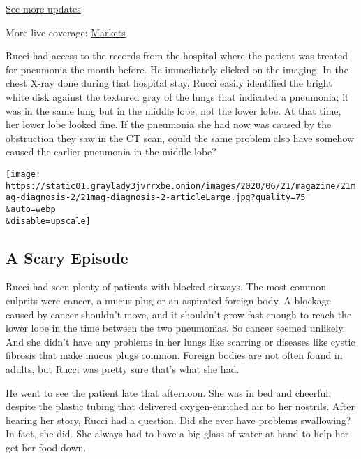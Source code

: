 \href{https://www.nytimes3xbfgragh.onion/2020/09/08/world/covid-19-coronavirus.html?action=click\&pgtype=Article\&state=default\&region=MAIN_CONTENT_1\&context=storylines_live_updates}{See
more updates}

More live coverage:
\href{https://www.nytimes3xbfgragh.onion/live/2020/09/08/business/stock-market-today-coronavirus?action=click\&pgtype=Article\&state=default\&region=MAIN_CONTENT_1\&context=storylines_live_updates}{Markets}

Rucci had access to the records from the hospital where the patient was
treated for pneumonia the month before. He immediately clicked on the
imaging. In the chest X-ray done during that hospital stay, Rucci easily
identified the bright white disk against the textured gray of the lungs
that indicated a pneumonia; it was in the same lung but in the middle
lobe, not the lower lobe. At that time, her lower lobe looked fine. If
the pneumonia she had now was caused by the obstruction they saw in the
CT scan, could the same problem also have somehow caused the earlier
pneumonia in the middle lobe?

\texttt{[image: https://static01.graylady3jvrrxbe.onion/images/2020/06/21/magazine/21mag-diagnosis-2/21mag-diagnosis-2-articleLarge.jpg?quality=75\\\&auto=webp\\\&disable=upscale]}

\hypertarget{a-scary-episode}{%
\subsection{\texorpdfstring{\textbf{A Scary
Episode}}{A Scary Episode}}\label{a-scary-episode}}

Rucci had seen plenty of patients with blocked airways. The most common
culprits were cancer, a mucus plug or an aspirated foreign body. A
blockage caused by cancer shouldn't move, and it shouldn't grow fast
enough to reach the lower lobe in the time between the two pneumonias.
So cancer seemed unlikely. And she didn't have any problems in her lungs
like scarring or diseases like cystic fibrosis that make mucus plugs
common. Foreign bodies are not often found in adults, but Rucci was
pretty sure that's what she had.

He went to see the patient late that afternoon. She was in bed and
cheerful, despite the plastic tubing that delivered oxygen-enriched air
to her nostrils. After hearing her story, Rucci had a question. Did she
ever have problems swallowing? In fact, she did. She always had to have
a big glass of water at hand to help her get her food down.

